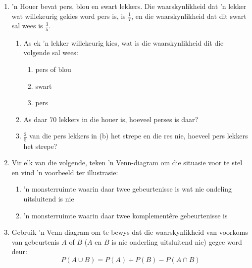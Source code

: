 \begin{eocexercises}{}
\begin{enumerate}[itemsep=5pt, label=\textbf{\arabic*}.]
\begin{enumerate}[noitemsep, label=\textbf{(\alph*)} ]
    \item Wat is die waarskynlikheid dat 'n kind wat willekeurig gekies word die volgende het:
      \begin{enumerate}[noitemsep, label=\roman*. ]
      \item bruin o\"e
      \item rooi hare
      \end{enumerate} 
    \item 'n Kind met bruin o\"e word willekeurig gekies. Wat is die waarskynlikheid dat hierdie kind rooi hare het?
    \end{enumerate}
  \item 'n Houer bevat pers, blou en swart lekkers. Die waarskynlikheid dat 'n lekker wat willekeurig gekies word pers is, is $\frac{1}{7}$, en die waarskynlikheid dat dit swart sal wees is $\frac{3}{5}$.
    \begin{enumerate}[noitemsep, label=\textbf{(\alph*)} ]
    \item As ek 'n lekker willekeurig kies, wat is die waarskynlikheid dit die volgende sal wees:
      \begin{enumerate}[noitemsep, label=\roman*. ]
      \item pers of blou
      \item swart
      \item pers
      \end{enumerate}
    \item As daar $70$ lekkers in die houer is, hoeveel perses is daar?
    \item $\frac{2}{5}$ van die pers lekkers in (b) het strepe en die res nie, hoeveel pers lekkers het strepe?
    \end{enumerate}
  \item Vir elk van die volgende, teken 'n Venn-diagram om die situasie voor te stel en vind 'n voorbeeld ter illustrasie:
    \begin{enumerate}[noitemsep, label=\textbf{(\alph*)} ]
    \item 'n monsterruimte waarin daar twee gebeurtenisse is wat nie ondeling uitsluitend is nie
    \item 'n monsterruimte waarin daar twee komplement\^ere gebeurtenisse is
    \end{enumerate}
  \item Gebruik 'n Venn-diagram om te bewys dat die waarskynlikheid van voorkoms van gebeurtenis  $A$ of $B$ ($A$ en $B$ is nie onderling uitsluitend nie) gegee word deur:
    \[P(A \cup B) = P(A) + P(B) - P(A \cap B)\]

\end{enumerate}
\end{eocexercises}
